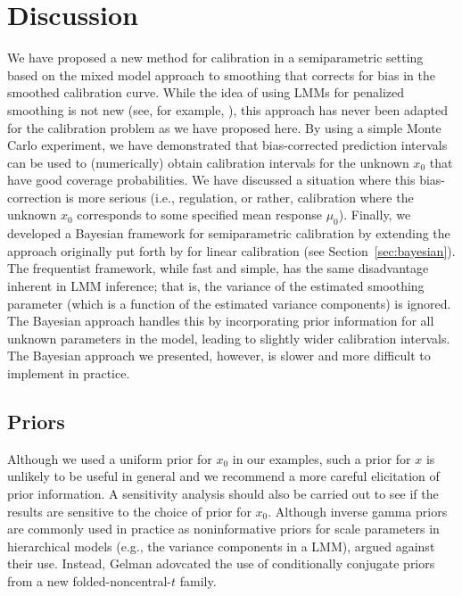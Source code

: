 \documentclass[cmfont,usenames,dvipsnames,leqno]{afit-etd}\usepackage[]{graphicx}\usepackage[]{color}
\begin{document}
\section{Discussion}
\label{sec:semipar-discussion}
We have proposed a new method for calibration in a semiparametric setting based on the mixed model approach to smoothing that corrects for bias in the smoothed calibration curve. While the idea of using \ac{LMM}s for penalized smoothing is not new (see, for example, \citet[pp. 13 - 17]{demidenko_mixed_2013}), this approach has never been adapted for the calibration problem as we have proposed here. By using a simple Monte Carlo experiment, we have demonstrated that bias-corrected prediction intervals can be used to (numerically) obtain calibration intervals for the unknown $x_0$ that have good coverage probabilities. We have discussed a situation where this bias-correction is more serious (i.e., regulation, or rather, calibration where the unknown $x_0$ corresponds to some specified mean response $\mu_0$). Finally, we developed a Bayesian framework for semiparametric calibration by extending the approach originally put forth by \citet{hoadley_bayesian_1970} for linear calibration (see Section~\ref{sec:bayesian}). The frequentist framework, while fast and simple, has the same disadvantage inherent in \ac{LMM} inference; that is, the variance of the estimated smoothing parameter (which is a function of the estimated variance components) is ignored. The Bayesian approach handles this by incorporating prior information for all unknown parameters in the model, leading to slightly wider calibration intervals. The Bayesian approach we presented, however, is slower and more difficult to implement in practice.

\subsection{Priors}
Although we used a uniform prior for $x_0$ in our examples, such a prior for $x$ is unlikely to be useful in general and we recommend a more careful elicitation of prior information. A sensitivity analysis should also be carried out to see if the results are sensitive to the choice of prior for $x_0$. Although inverse gamma priors are commonly used in practice as noninformative priors for scale parameters in hierarchical models (e.g., the variance components in a \ac{LMM}), \citet{gelman_prior_2006} argued against their use. Instead, Gelman adovcated the use of conditionally conjugate priors from a new folded-noncentral-$t$ family.
\end{document}
